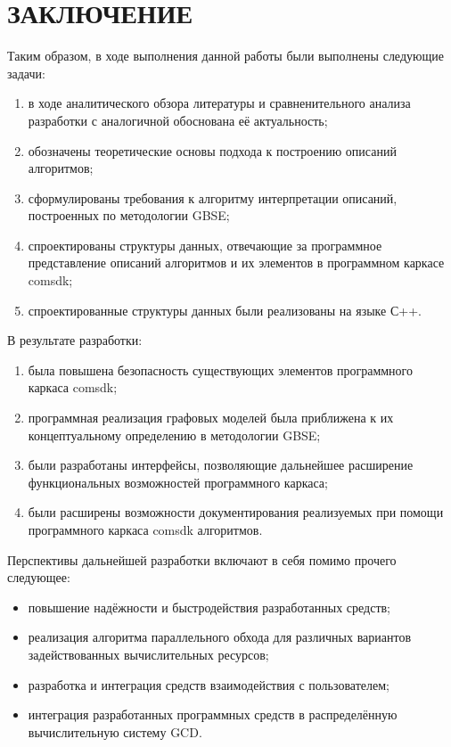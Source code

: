 \chapter*{ЗАКЛЮЧЕНИЕ}\label{chap_conclusion}
Таким образом, в ходе выполнения данной работы были выполнены следующие задачи:
\begin{enumerate}[1)]
    \item в ходе аналитического обзора литературы и сравненительного анализа разработки с аналогичной обоснована её актуальность;
    \item обозначены теоретические основы подхода  к построению описаний алгоритмов;
    \item сформулированы требования к алгоритму интерпретации описаний, построенных по методологии GBSE;
    \item спроектированы структуры данных, отвечающие за программное представление описаний алгоритмов и их элементов в программном каркасе comsdk;
    \item спроектированные структуры данных были реализованы на языке С++.
\end{enumerate}

В результате разработки:
\begin{enumerate}[1)]
    \item была повышена безопасность существующих элементов программного каркаса comsdk;
    \item программная реализация графовых моделей была приближена к их концептуальному определению в методологии GBSE;
    \item были разработаны интерфейсы, позволяющие дальнейшее расширение функциональных возможностей программного каркаса;
    \item были расширены возможности документирования реализуемых при помощи программного каркаса comsdk алгоритмов.
\end{enumerate}

Перспективы дальнейшей разработки включают в себя помимо прочего следующее:
\begin{itemize}
    \item повышение надёжности и быстродействия разработанных средств;
    \item реализация алгоритма параллельного обхода для различных вариантов задействованных вычислительных ресурсов;
    \item разработка и интеграция средств взаимодействия с пользователем;
    \item интеграция разработанных программных средств в распределённую вычислительную систему GCD.
\end{itemize}
